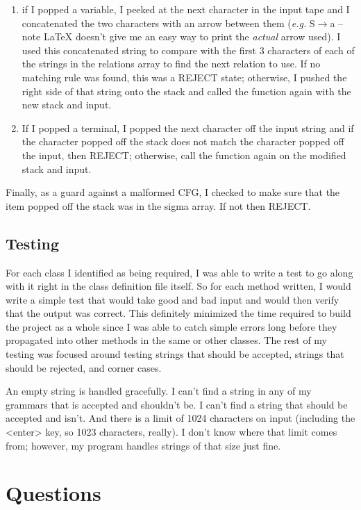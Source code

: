 \documentclass[11pt]{article}
\begin{document}
\begin{enumerate}
	\item if I popped a variable, I peeked at the next character in the input tape and I concatenated the two characters with an arrow between them (\emph{e.g.} S$\rightarrow$a -- note \LaTeX{} doesn't give me an easy way to print the \emph{actual} arrow used). I used this concatenated string to compare with the first 3 characters of each of the strings in the relations array to find the next relation to use. If no matching rule was found, this was a REJECT state; otherwise, I pushed the right side of that string onto the stack and called the function again with the new stack and input. 
	\item If I popped a terminal, I popped the next character off the input string and if the character popped off the stack does not match the character popped off the input, then REJECT; otherwise, call the function again on the modified stack and input.
\end{enumerate}

Finally, as a guard against a malformed CFG, I checked to make sure that  the item popped off the stack was in the sigma array. If not then REJECT.

\subsection{Testing}
For each class I identified as being required, I was able to write a test to go along with it right in the class definition file itself. So for each method written, I would write a simple test that would take good and bad input and would then verify that the output was correct. This definitely minimized the time required to build the project as a whole since I was able to catch simple errors long before they propagated into other methods in the same or other classes. The rest of my testing was focused around testing strings that should be accepted, strings that should be rejected, and corner cases. 

An empty string is handled gracefully. I can't find a string in any of my grammars that is accepted and shouldn't be. I can't find a string that should be accepted and isn't. And there is a limit of 1024 characters on input (including the <enter> key, so 1023 characters, really). I don't know where that limit comes from; however, my program handles strings of that size just fine.

\section*{Questions}
\end{document}
